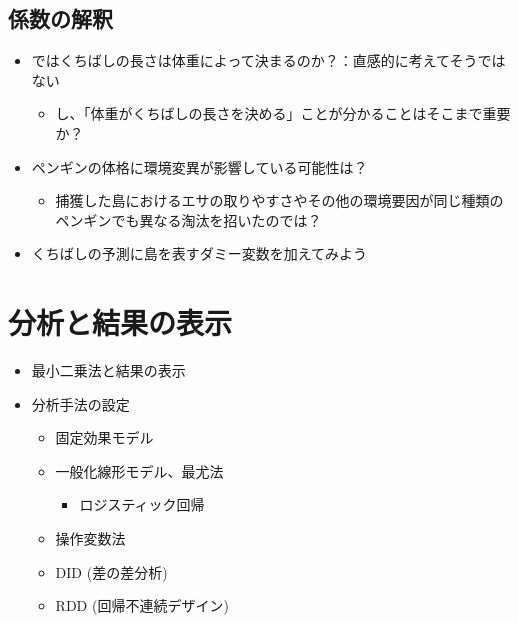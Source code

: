 \documentclass[
]{ltjsarticle}
\providecommand{\tightlist}{%
  \setlength{\itemsep}{0pt}\setlength{\parskip}{0pt}}
\begin{document}
\hypertarget{ux4fc2ux6570ux306eux89e3ux91c8}{%
\subsection{係数の解釈}\label{ux4fc2ux6570ux306eux89e3ux91c8}}

\begin{itemize}
\tightlist
\item
  ではくちばしの長さは体重によって決まるのか？：直感的に考えてそうではない

  \begin{itemize}
  \tightlist
  \item
    し、「体重がくちばしの長さを決める」ことが分かることはそこまで重要か？
  \end{itemize}
\item
  ペンギンの体格に環境変異が影響している可能性は？

  \begin{itemize}
  \tightlist
  \item
    捕獲した島におけるエサの取りやすさやその他の環境要因が同じ種類のペンギンでも異なる淘汰を招いたのでは？
  \end{itemize}
\item
  くちばしの予測に島を表すダミー変数を加えてみよう
\end{itemize}

\hypertarget{ux5206ux6790ux3068ux7d50ux679cux306eux8868ux793a}{%
\section{分析と結果の表示}\label{ux5206ux6790ux3068ux7d50ux679cux306eux8868ux793a}}

\begin{itemize}
\tightlist
\item
  最小二乗法と結果の表示
\item
  分析手法の設定

  \begin{itemize}
  \tightlist
  \item
    固定効果モデル
  \item
    一般化線形モデル、最尤法

    \begin{itemize}
    \tightlist
    \item
      ロジスティック回帰
    \end{itemize}
  \item
    操作変数法
  \item
    DID (差の差分析)
  \item
    RDD (回帰不連続デザイン)
  \end{itemize}
\end{itemize}
\end{document}
